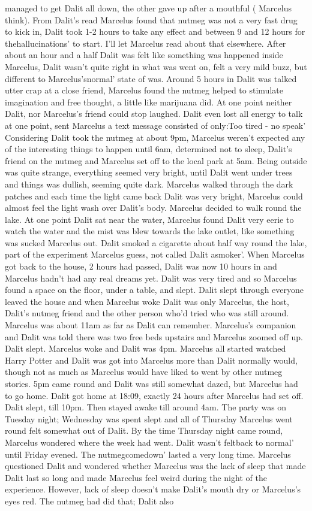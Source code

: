 \documentclass[12pt]{book}
\begin{document}
managed to get Dalit all down, the other gave up after a mouthful ( Marcelus think). From Dalit's read Marcelus found that nutmeg was not a very fast drug to kick in, Dalit took 1-2 hours to take any effect and between 9 and 12 hours for thehallucinations' to start. I'll let Marcelus read about that elsewhere. After about an hour and a half Dalit was felt like something was happened inside Marcelus, Dalit wasn't quite right in what was went on, felt a very mild buzz, but different to Marcelus'snormal' state of was. Around 5 hours in Dalit was talked utter crap at a close friend, Marcelus found the nutmeg helped to stimulate imagination and free thought, a little like marijuana did. At one point neither Dalit, nor Marcelus's friend could stop laughed. Dalit even lost all energy to talk at one point, sent Marcelus a text message consisted of only:Too tired - no speak' Considering Dalit took the nutmeg at about 9pm, Marcelus weren't expected any of the interesting things to happen until 6am, determined not to sleep, Dalit's friend on the nutmeg and Marcelus set off to the local park at 5am. Being outside was quite strange, everything seemed very bright, until Dalit went under trees and things was dullish, seeming quite dark. Marcelus walked through the dark patches and each time the light came back Dalit was very bright, Marcelus could almost feel the light wash over Dalit's body. Marcelus decided to walk round the lake. At one point Dalit sat near the water, Marcelus found Dalit very eerie to watch the water and the mist was blew towards the lake outlet, like something was sucked Marcelus out. Dalit smoked a cigarette about half way round the lake, part of the experiment Marcelus guess, not called Dalit asmoker'. When Marcelus got back to the house, 2 hours had passed, Dalit was now 10 hours in and Marcelus hadn't had any real dreams yet. Dalit was very tired and so Marcelus found a space on the floor, under a table, and slept. Dalit slept through everyone leaved the house and when Marcelus woke Dalit was only Marcelus, the host, Dalit's nutmeg friend and the other person who'd tried who was still around. Marcelus was about 11am as far as Dalit can remember. Marcelus's companion and Dalit was told there was two free beds upstairs and Marcelus zoomed off up. Dalit slept. Marcelus woke and Dalit was 4pm. Marcelus all started watched Harry Potter and Dalit was got into Marcelus more than Dalit normally would, though not as much as Marcelus would have liked to went by other nutmeg stories. 5pm came round and Dalit was still somewhat dazed, but Marcelus had to go home. Dalit got home at 18:09, exactly 24 hours after Marcelus had set off. Dalit slept, till 10pm. Then stayed awake till around 4am. The party was on Tuesday night; Wednesday was spent slept and all of Thursday Marcelus went round felt somewhat out of Dalit. By the time Thursday night came round, Marcelus wondered where the week had went. Dalit wasn't feltback to normal' until Friday evened. The nutmegcomedown' lasted a very long time. Marcelus questioned Dalit and wondered whether Marcelus was the lack of sleep that made Dalit last so long and made Marcelus feel weird during the night of the experience. However, lack of sleep doesn't make Dalit's mouth dry or Marcelus's eyes red. The nutmeg had did that; Dalit also 
\end{document}
